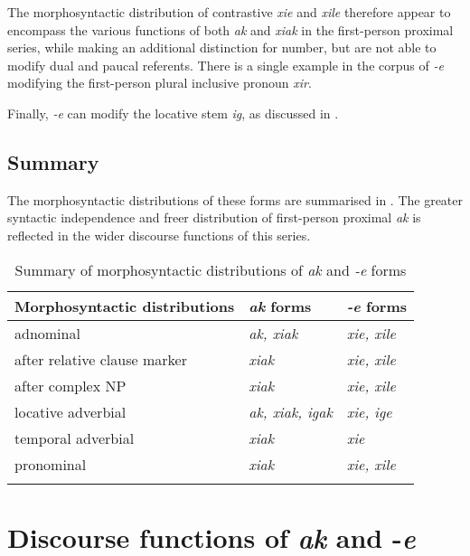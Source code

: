 \documentclass[output=paper,colorlinks,citecolor=brown]{langscibook}
\begin{document}
The morphosyntactic distribution of contrastive \textit{xie} and \textit{xile} therefore appear to encompass the various functions of both \textit{ak} and \textit{xiak} in the first-person proximal series, while making an additional distinction for number, but are not able to modify dual and paucal referents. There is a single example in the corpus of \textit{-e} modifying the first-person plural inclusive pronoun \textit{xir}.

Finally, \textit{-e} can modify the locative stem \textit{ig}, as discussed in .


\subsection{Summary}
\label{sec:ridge:3.3}

The morphosyntactic distributions of these forms are summarised in . The greater syntactic independence and freer distribution of first-person proximal \textit{ak} is reflected in the wider discourse functions of this series.

\begin{table}
\caption{Summary of morphosyntactic distributions of \textit{ak} and \textit{-e} forms}
\label{tab:ridge:7}
\begin{tabularx}{\textwidth}{lXl}
\lsptoprule
\textbf{Morphosyntactic distributions} & \textbf{\textit{ak} forms} & \textbf{\textit{-e} forms}\\
\midrule 
{adnominal} & \textit{ak, xiak} & \textit{xie, xile}\\
{after relative clause marker} & \textit{xiak} & \textit{xie, xile}\\
{after complex NP} & \textit{xiak} & \textit{xie, xile}\\
{locative adverbial} & \textit{ak, xiak, igak} & \textit{xie, ige}\\
{temporal adverbial} & \textit{xiak} & \textit{xie}\\
{pronominal} & \textit{xiak} & \textit{xie, xile}\\
\lspbottomrule
\end{tabularx}
\end{table}

\section{Discourse functions of \textit{ak} and -\textit{e}}
\label{sec:ridge:4}
\end{document}
